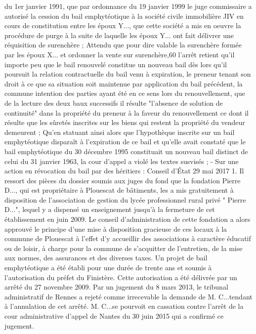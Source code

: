 \documentclass[11pt,a4paper]{report}
\begin{document}
	du 1er janvier 1991, que par ordonnance du 19 janvier 1999 le juge commissaire a autorisé la cession du bail
	emphytéotique à la société civile immobilière JIV en cours de constitution entre les époux Y..., que cette société a
	mis en oeuvre la procédure de purge à la suite de laquelle les époux Y... ont fait délivrer une réquisition de
	surenchère ;
	Attendu que pour dire valable la surenchère formée par les époux X... et ordonner la vente sur surenchère,60
	l'arrêt retient qu'il importe peu que le bail renouvelé constitue un nouveau bail dès lors qu'il poursuit la relation
	contractuelle du bail venu à expiration, le preneur tenant son droit à ce que sa situation soit maintenue par
	application du bail précédent, la commune intention des parties ayant été en ce sens lors du renouvellement, que
	de la lecture des deux baux successifs il résulte "l'absence de solution de continuité" dans la propriété du
	preneur à la faveur du renouvellement ce dont il résulte que les sûretés inscrites sur les biens qui restent la
	propriété du vendeur demeurent ;
	Qu'en statuant ainsi alors que l'hypothèque inscrite sur un bail emphytéotique disparaît à l'expiration de ce bail
	et qu'elle avait constaté que le bail emphytéotique du 30 décembre 1995 constituait un nouveau bail distinct de
	celui du 31 janvier 1963, la cour d'appel a violé les textes susvisés ;
	- Sur une action en révocation du bail par des héritiers : Conseil d'État 29 mai 2017 
	1. Il ressort des pièces du dossier soumis aux juges du fond que la fondation Pierre D..., qui est propriétaire à
	Plouescat de bâtiments, les a mis gratuitement à disposition de l'association de gestion du lycée professionnel
	rural privé " Pierre D...", lequel y a dispensé un enseignement jusqu'à la fermeture de cet établissement en juin
	2009. Le conseil d'administration de cette fondation a alors approuvé le principe d'une mise à disposition
	gracieuse de ces locaux à la commune de Plouescat à l'effet d'y accueillir des associations à caractère éducatif
	ou de loisir, à charge pour la commune de s'acquitter de l'entretien, de la mise aux normes, des assurances et
	des diverses taxes. Un projet de bail emphytéotique a été établi pour une durée de trente ans et soumis à
	l'autorisation du préfet du Finistère. Cette autorisation a été délivrée par un arrêté du 27 novembre 2009. Par
	un jugement du 8 mars 2013, le tribunal administratif de Rennes a rejeté comme irrecevable la demande de M.
	C...tendant à l'annulation de cet arrêté. M. C...se pourvoit en cassation contre l'arrêt de la cour administrative
	d'appel de Nantes du 30 juin 2015 qui a confirmé ce jugement.
\end{document}
